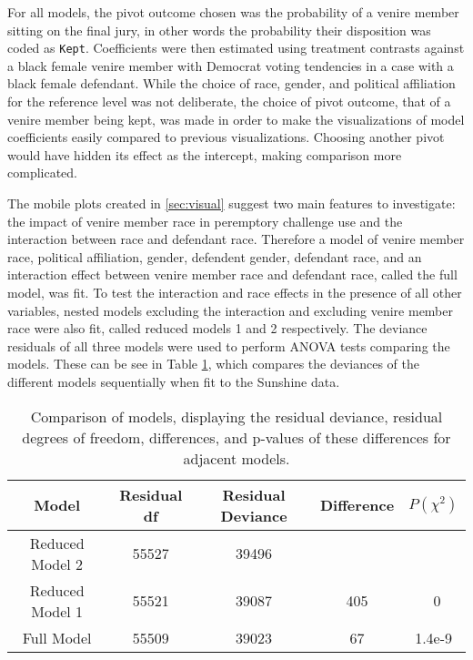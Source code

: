 For all models, the pivot outcome chosen was the probability of a
venire member sitting on the final jury, in other words the probability their disposition was coded as \texttt{Kept}. Coefficients were
then estimated using treatment contrasts against a black female venire member with Democrat voting tendencies in a case with a black female
defendant. While the choice of race, gender, and political affiliation for the reference level was not deliberate, the choice of pivot outcome, that of a venire member being kept, was made in order to make the visualizations of model coefficients easily compared to previous visualizations. Choosing another pivot would have hidden its effect as the intercept, making comparison more complicated.

The mobile plots created in \ref{sec:visual} suggest two main features
to investigate: the impact of venire member race in peremptory
challenge use and the interaction between race and
defendant race. Therefore a model of venire member race, political affiliation,
gender, defendent gender, defendant race, and an interaction effect
between venire member race and defendant race, called the full model,
was fit. To test the interaction and race effects in the presence of
all other variables, nested models excluding the interaction and excluding venire member race were also fit, called reduced models 1 and 2 respectively. The deviance residuals of all three models were used to perform ANOVA tests comparing the models. These can be see in Table \ref{tab:modcomp}, which compares the deviances of the different models sequentially when fit to the Sunshine data.

\begin{table}[h!]
  \centering
  \caption[Nested ANOVA Table Demonstrating the Importance of
  Race]{\footnotesize Comparison of models, displaying the residual deviance, residual degrees of freedom, differences, and p-values of these
    differences for adjacent models.}
  \label{tab:modcomp}
  \begin{tabular}{|c|c|c|c|c|} \hline
    Model & Residual df & Residual Deviance & Difference & $P(\chi^2)$ \\ \hline
    Reduced Model 2 & 55527 & 39496 &  &  \\
    Reduced Model 1 & 55521 & 39087 & 405 & ~0 \\
    Full Model & 55509 & 39023 & 67 & 1.4e-9 \\ \hline
  \end{tabular}
\end{table}

